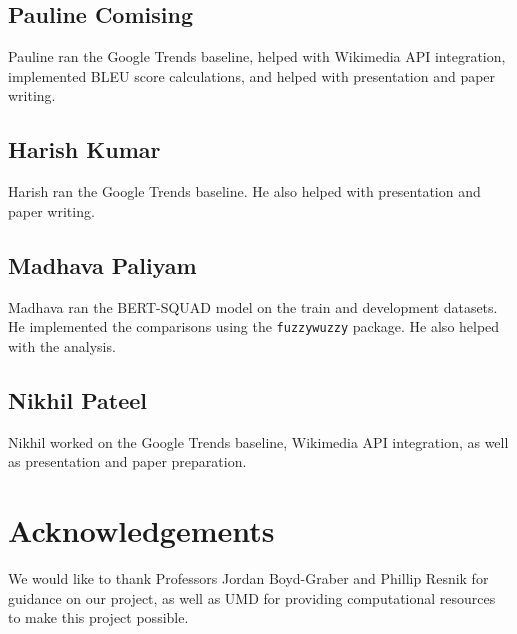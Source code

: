 \documentclass{article}
\begin{document}
\subsection{Pauline Comising}
Pauline ran the Google Trends baseline, helped with Wikimedia API integration,
implemented BLEU score calculations, and helped with presentation and paper
writing.
\subsection{Harish Kumar}
Harish ran the Google Trends baseline. He also helped with presentation and
paper writing.
\subsection{Madhava Paliyam}
Madhava ran the BERT-SQUAD model on the train and development datasets. He
implemented the comparisons using the {\tt fuzzywuzzy} package. He also helped
with the analysis.

\subsection{Nikhil Pateel}
Nikhil worked on the Google Trends baseline, Wikimedia API integration, as well
as presentation and paper preparation.


\section*{Acknowledgements}

We would like to thank Professors Jordan Boyd-Graber and Phillip Resnik for
guidance on our project, as well as UMD for providing computational resources to
make this project possible.




\end{document}

